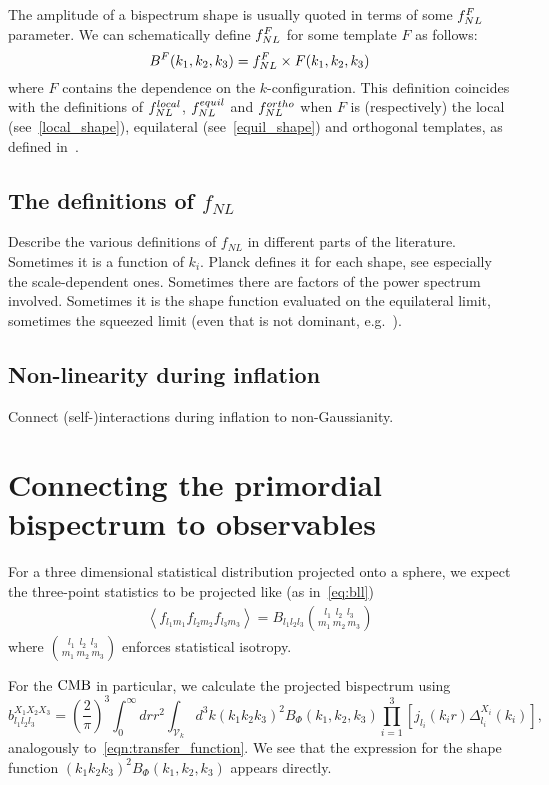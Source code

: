 The amplitude of a bispectrum shape is usually
quoted in terms of some $f_{NL}^F$ parameter.
We can schematically define $f_{NL}^F$ for some template $F$ as follows:
\begin{equation}\label{def:fnl}
{
B^{F}(k_1,k_2,k_3) = f_{NL}^{F}\times F(k_1,k_2,k_3)
}
\end{equation}
where $F$ contains the dependence on the $k$-configuration.
This definition coincides with the definitions of
$f^{local}_{NL}$, $f^{equil}_{NL}$ and $f^{ortho}_{NL}$
when $F$ is (respectively) the local (see~\eqref{local_shape}),
equilateral (see~\eqref{equil_shape}) and orthogonal templates,
as defined in~\cite{Planck_NG_2013, Planck_NG_2015}.

    \subsection{The definitions of $f_{NL}$}
    Describe the various definitions of $f_{NL}$ in different
    parts of the literature.
    Sometimes it is a function of $k_i$. Planck defines it for each
    shape, see especially the scale-dependent ones. Sometimes there are
    factors of the power spectrum involved. Sometimes it is the shape
    function evaluated on the equilateral limit, sometimes the squeezed limit
    (even that is not dominant, e.g.~\cite{dbi_in_the_sky}).
    \subsection{Non-linearity during inflation}
    Connect (self-)interactions during inflation to non-Gaussianity.
\section{Connecting the primordial bispectrum to observables}
    For a three dimensional statistical distribution projected onto
    a sphere, we expect the three-point statistics to be projected
    like (as in~\eqref{eq:bll})
    \begin{align}
        \left<f_{l_1m_1}f_{l_2m_2}f_{l_3m_3}\right> = B_{l_1l_2l_3}{{l_1~~l_2~~l_3} \choose {m_1~m_2~m_3}}
    \end{align}
    where ${{l_1~~l_2~~l_3} \choose {m_1~m_2~m_3}}$ enforces statistical isotropy.


    For the $\text{CMB}$ in particular, we calculate the projected bispectrum using
    \begin{equation}
    \label{eq:reduced_cmb}
    b^{X_1X_2X_3}_{l_1l_2l_3} = \left(\frac{2}{\pi}\right)^3\int_{0}^{\infty}drr^2
        \int_{\mathcal{V}_k}d^3k (k_1k_2k_3)^2 B_{\Phi}(k_1,k_2,k_3)\prod_{i=1}^{3}\left[j_{l_i}(k_ir)\Delta^{X_i}_{l_i}(k_i)\right],
    \end{equation}
    analogously to~\eqref{eqn:transfer_function}.
    We see that the expression for the shape function $(k_1k_2k_3)^2 B_{\Phi}(k_1,k_2,k_3)$ appears directly.


